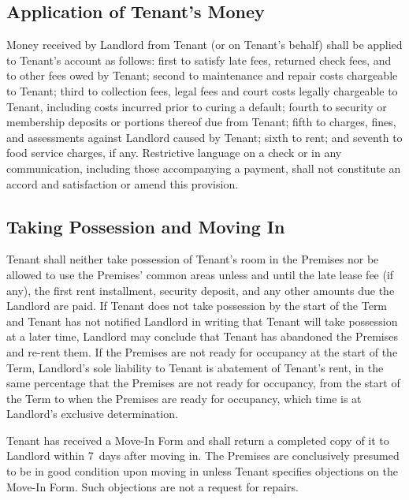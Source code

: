 \documentclass{article}
\begin{document}
\subsection{Application of Tenant’s Money}
Money received by Landlord from Tenant (or on Tenant’s behalf) shall be applied
to Tenant’s account as follows: first to satisfy late fees, returned check fees,
and to other fees owed by Tenant; second to maintenance and repair costs
chargeable to Tenant; third to collection fees, legal fees and court costs
legally chargeable to Tenant, including costs incurred prior to curing a
default; fourth to security or membership deposits or portions thereof due from
Tenant; fifth to charges, fines, and assessments against Landlord caused by
Tenant; sixth to rent; and seventh to food service charges, if any. Restrictive
language on a check or in any communication, including those accompanying a
payment, shall not constitute an accord and satisfaction or amend this
provision.

\subsection{Taking Possession and Moving In}
Tenant shall neither take possession of Tenant’s room in the Premises nor be
allowed to use the Premises’ common areas unless and until the late lease fee
(if any), the first rent installment, security deposit, and any other amounts
due the Landlord are paid. If Tenant does not take possession by the start of
the Term and Tenant has not notified Landlord in writing that Tenant will take
possession at a later time, Landlord may conclude that Tenant has abandoned the
Premises and re-rent them. If the Premises are not ready for occupancy at the
start of the Term, Landlord’s sole liability to Tenant is abatement of Tenant’s
rent, in the same percentage that the Premises are not ready for occupancy, from
the start of the Term to when the Premises are ready for occupancy, which time
is at Landlord’s exclusive determination.

Tenant has received a Move-In Form and shall return a completed copy of it to
Landlord within 7~days after moving in. The Premises are conclusively presumed
to be in good condition upon moving in unless Tenant specifies objections on the
Move-In Form. Such objections are not a request for repairs.
\end{document}
